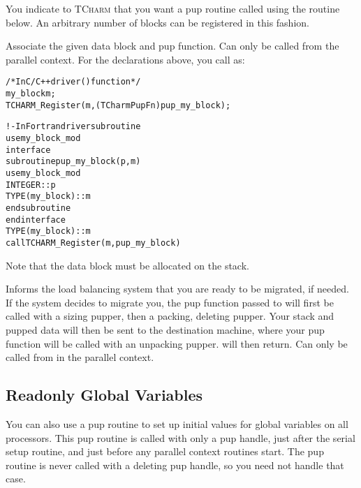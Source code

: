 \documentclass[10pt]{article}
\newcommand{\tcharm}{\textsc{TCharm}}
\begin{document}
You indicate to \tcharm{} that you want a pup routine called using
the routine below.  An arbitrary number of blocks can be registered
in this fashion.

\vspace{0.2in}

     Associate the given data block and pup function.  Can only be
     called from the parallel context.  For the declarations above, you call
      as:

\begin{alltt}
          /*In C/C++ driver() function*/
          my_block m;
          TCHARM_Register(m,(TCharmPupFn)pup_my_block);
 
          !- In Fortran driver subroutine
          use my_block_mod
          interface
            subroutine pup_my_block(p,m)
              use my_block_mod
              INTEGER :: p
              TYPE(my_block) :: m
            end subroutine
          end interface
          TYPE(my_block) :: m
          call TCHARM_Register(m,pup_my_block)
\end{alltt}

     Note that the data block must be allocated on the stack.

\vspace{0.2in}

     Informs the load balancing system that you are ready to be
     migrated, if needed.  If the system decides to migrate you, the
     pup function passed to  will first be called with 
     a sizing pupper, then a packing, deleting pupper.  Your stack and pupped
     data will then be sent to the destination machine, where your pup
     function will be called with an unpacking pupper.  
     will then return.  Can only be called from in the parallel context.



\subsection{Readonly Global Variables}
\label{sec:readonlyglobal}

You can also use a pup routine to set up initial values for global
variables on all processors.  This pup routine is called with only
a pup handle, just after the serial setup routine, and just before 
any parallel context routines start.  The pup routine is never
called with a deleting pup handle, so you need not handle that case.
\end{document}
